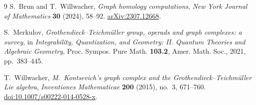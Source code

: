 \documentclass[11pt]{article}
\theoremstyle{definition}
\theoremstyle{plain}
\begin{document}
\begin{thebibliography}{9}
S.~Brun and T.~Willwacher,
\emph{Graph homology computations},
\emph{New York Journal of Mathematics} \textbf{30} (2024), 58--92.
\href{https://arxiv.org/abs/2307.12668}{arXiv:2307.12668}.

S.~Merkulov,
\emph{Grothendieck--Teichm\"uller group, operads and graph complexes: a survey},
in \emph{Integrability, Quantization, and Geometry: II. Quantum Theories and Algebraic Geometry},
Proc. Sympos. Pure Math. \textbf{103.2}, Amer. Math. Soc., 2021, pp.~383--445.

T.~Willwacher,
\emph{M.~Kontsevich's graph complex and the Grothendieck--Teichm\"uller Lie algebra},
\emph{Inventiones Mathematicae} \textbf{200} (2015), no.~3, 671--760.
\href{https://doi.org/10.1007/s00222-014-0528-x}{doi:10.1007/s00222-014-0528-x}.
\end{thebibliography}
\end{document}
